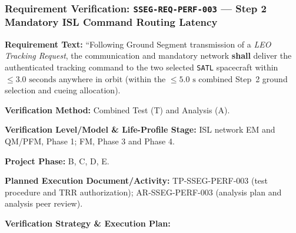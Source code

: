 \subsubsection{Requirement Verification: \texttt{SSEG-REQ-PERF-003} --- Step 2 Mandatory ISL Command Routing Latency}
\label{ver:SSEG-REQ-PERF-003}
\textbf{Requirement Text:} ``Following Ground Segment transmission of a \emph{LEO Tracking Request}, the  communication and mandatory  network \textbf{shall} deliver the authenticated tracking command to the two selected \texttt{SATL} spacecraft within $\le 3.0\text{ seconds}$ anywhere in orbit (within the $\le 5.0\text{ s}$ combined Step~2 ground selection and cueing allocation).
\par\textbf{Verification Method:} Combined Test (T) and Analysis (A).
\par\textbf{Verification Level/Model \& Life-Profile Stage:} ISL network EM and QM/PFM, Phase 1; FM, Phase 3 and Phase 4.
\par\textbf{Project Phase:} B, C, D, E.
\par\textbf{Planned Execution Document/Activity:} TP-SSEG-PERF-003 (test procedure and TRR authorization); AR-SSEG-PERF-003 (analysis plan and analysis peer review).
\par\textbf{Verification Strategy \& Execution Plan:}
